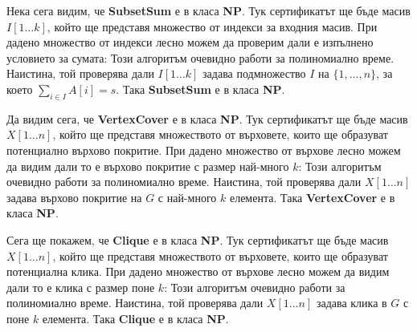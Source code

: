 Нека сега видим, че \textbf{SubsetSum} е в класа \textbf{NP}.
Тук сертификатът ще бъде масив $I[1 \dots k]$, който ще представя множество от индекси за входния масив.
При дадено множество от индекси лесно можем да проверим дали е изпълнено условието за сумата:
Този алгоритъм очевидно работи за полиномиално време.
Наистина, той проверява дали $I[1 \dots k]$ задава подмножество $I$ на $\{ 1, \dots, n \}$, за което $\sum\limits_{i \in I} A[i] = s$.
Така \textbf{SubsetSum} е в класа \textbf{NP}.

Да видим сега, че \textbf{VertexCover} е в класа \textbf{NP}.
Тук сертификатът ще бъде масив $X[1 \dots n]$, който ще представя множеството от върховете, които ще образуват потенциално върхово покритие.
При дадено множество от върхове лесно можем да видим дали то е върхово покритие с размер най-много $k$:
Този алгоритъм очевидно работи за полиномиално време.
Наистина, той проверява дали $X[1 \dots n]$ задава върхово покритие на $G$ с най-много $k$ елемента.
Така \textbf{VertexCover} е в класа \textbf{NP}.

Сега ще покажем, че \textbf{Clique} е в класа \textbf{NP}.
Тук сертификатът ще бъде масив $X[1 \dots n]$, който ще представя множеството от върховете, които ще образуват потенциална клика.
При дадено множество от върхове лесно можем да видим дали то е клика с размер поне $k$:
Този алгоритъм очевидно работи за полиномиално време.
Наистина, той проверява дали $X[1 \dots n]$ задава клика в $G$ с поне $k$ елемента.
Така \textbf{Clique} е в класа \textbf{NP}.